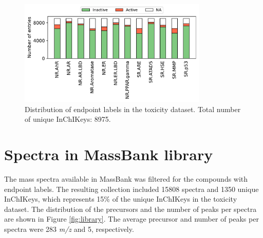 \begin{figure}[h]
	\centering
  \includegraphics[width=0.8\textwidth]{include/img/results/labelsTox21.pdf}
  \caption{Distribution of endpoint labels in the toxicity dataset. Total number of unique InChIKeys: 8975.}
  \label{fig:bars_endpoints}
\end{figure}	





\section*{Spectra in MassBank library}

The mass spectra available in MassBank was filtered for the compounds with endpoint labels. The resulting collection included 15808 spectra and 1350 unique InChIKeys, which represents 15\% of the unique InChIKeys in the toxicity dataset. The distribution of the precursors and the number of peaks per spectra are shown in Figure \ref{fig:library}. The average precursor and number of peaks per spectra were 283 \textit{m/z} and 5, respectively.

